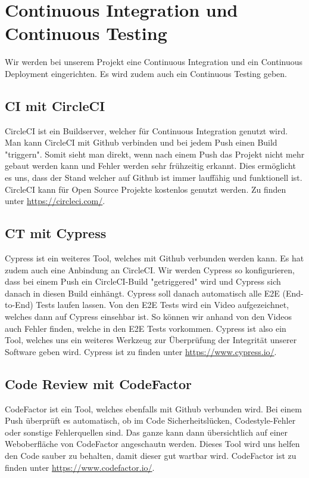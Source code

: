 	\section{Continuous Integration und Continuous Testing}
	Wir werden bei unserem Projekt eine Continuous Integration und ein Continuous Deployment eingerichten. Es wird zudem auch ein Continuous Testing geben.

	\subsection{CI mit CircleCI}
	CircleCI ist ein Buildserver, welcher für Continuous Integration genutzt wird. Man kann CircleCI mit Github verbinden und bei jedem Push einen Build "triggern". Somit sieht man direkt, wenn nach einem Push das Projekt nicht mehr gebaut werden kann und Fehler werden sehr frühzeitig erkannt. Dies ermöglicht es uns, dass der Stand welcher auf Github ist immer lauffähig und funktionell ist. CircleCI kann für Open Source Projekte kostenlos genutzt werden. Zu finden unter \href{https://circleci.com/}{https://circleci.com/}.

	\subsection{CT mit Cypress}
	Cypress ist ein weiteres Tool, welches mit Github verbunden werden kann. Es hat zudem auch eine Anbindung an CircleCI. Wir werden Cypress so konfigurieren, dass bei einem Push ein CircleCI-Build "getriggered" wird und Cypress sich danach in diesen Build einhängt. Cypress soll danach automatisch alle E2E (End-to-End) Tests laufen lassen. Von den E2E Tests wird ein Video aufgezeichnet, welches dann auf Cypress einsehbar ist. So können wir anhand von den Videos auch Fehler finden, welche in den E2E Tests vorkommen. Cypress ist also ein Tool, welches uns ein weiteres Werkzeug zur Überprüfung der Integrität unserer Software geben wird. Cypress ist zu finden unter \href{https://www.cypress.io/}{https://www.cypress.io/}.

	\subsection{Code Review mit CodeFactor}
	CodeFactor ist ein Tool, welches ebenfalls mit Github verbunden wird. Bei einem Push überprüft es automatisch, ob im Code Sicherheitslücken, Codestyle-Fehler oder sonstige Fehlerquellen sind. Das ganze kann dann übersichtlich auf einer Weboberfläche von CodeFactor angeschautn werden. Dieses Tool wird uns helfen den Code sauber zu behalten, damit dieser gut wartbar wird. CodeFactor ist zu finden unter \href{https://www.codefactor.io/}{https://www.codefactor.io/}.

